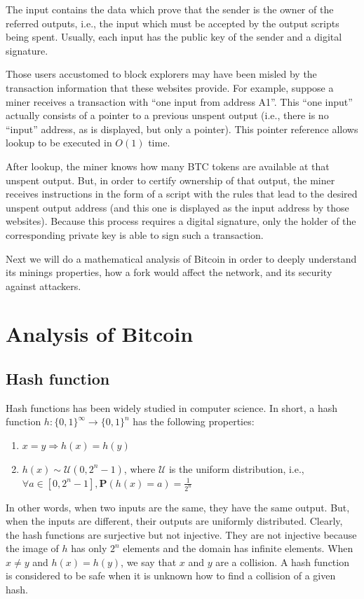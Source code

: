 The input contains the data which prove that the sender is the owner of the referred outputs, i.e., the input which must be accepted by the output scripts being spent. Usually, each input has the public key of the sender and a digital signature.

Those users accustomed to block explorers may have been misled by the transaction information that these websites provide.  For example, suppose a miner receives a transaction with ``one input from address A1''.  This ``one input'' actually consists of a pointer to a previous unspent output (i.e., there is no ``input'' address, as is displayed, but only a pointer). This pointer reference allows lookup to be executed in $O(1)$ time. 

After lookup, the miner knows how many BTC tokens are available at that unspent output.  But, in order to certify ownership of that output, the miner receives instructions in the form of a script with the rules that lead to the desired unspent output address (and this one is displayed as the input address by those websites). Because this process requires a digital signature, only the holder of the corresponding private key is able to sign such a transaction.

Next we will do a mathematical analysis of Bitcoin in order to deeply understand its minings properties, how a fork would affect the network, and its security against attackers.

\chapter{Analysis of Bitcoin}

\section{Hash function}

Hash functions has been widely studied in computer science. In short, a hash function $h: \{0, 1\}^\infty \rightarrow \{0, 1\}^{n}$ has the following properties:

\begin{enumerate}
	\item $x = y \Rightarrow h(x) = h(y)$
	\item $h(x) \sim \mathcal{U}(0, 2^{n}-1)$, where $\mathcal{U}$ is the uniform distribution, i.e., $\forall a \in [0, 2^{n}-1], \mathbf{P}(h(x)=a) = \frac{1}{2^{n}}$
\end{enumerate}

In other words, when two inputs are the same, they have the same output. But, when the inputs are different, their outputs are uniformly distributed. Clearly, the hash functions are surjective but not injective. They are not injective because the image of $h$ has only $2^n$ elements and the domain has infinite elements. When $x \ne y$ and $h(x) = h(y)$, we say that $x$ and $y$ are a collision. A hash function is considered to be safe when it is unknown how to find a collision of a given hash.

